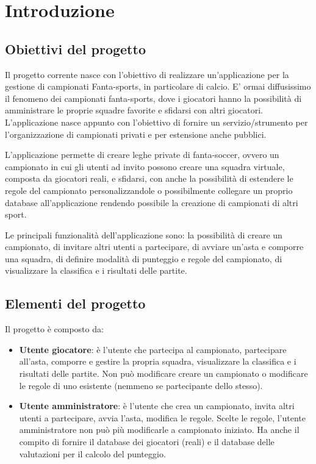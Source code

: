 \documentclass[twoside,openright,titlepage,fleqn,headinclude,12pt,a4paper,BCOR=5mm,footinclude]{scrbook}
\begin{document}
\clearpage
\chapter{Introduzione}
\section{Obiettivi del progetto}
Il progetto corrente nasce con l'obiettivo di realizzare un'applicazione per la gestione di campionati Fanta-sports, in particolare di calcio.
E' ormai diffusissimo il fenomeno dei campionati fanta-sports, dove i giocatori hanno la possibilità di amministrare le proprie squadre favorite e 
sfidarsi con altri giocatori. L'applicazione nasce appunto con l'obiettivo di fornire un servizio/strumento per l'organizzazione di campionati privati e
per estensione anche pubblici.

L'applicazione permette di creare leghe private di fanta-soccer, ovvero un campionato in cui gli utenti ad invito possono creare una squadra virtuale, 
composta da giocatori reali, e sfidarsi, con anche la possibilità di estendere le regole del campionato personalizzandole o possibilmente collegare
un proprio database all'applicazione rendendo possibile la creazione di campionati di altri sport.

Le principali funzionalità dell'applicazione sono: la possibilità di creare un campionato, di invitare altri utenti a partecipare, di avviare un'asta 
e comporre una squadra, di definire modalità di punteggio e regole del campionato, di visualizzare la classifica e i risultati delle partite.

\section{Elementi del progetto}
Il progetto è composto da:
\begin{itemize}
    \item \textbf{Utente giocatore}: è l'utente che partecipa al campionato, partecipare all'asta, comporre e gestire la propria squadra, 
    visualizzare la classifica e i risultati delle partite. Non può modificare creare un campionato o modificare le regole di uno esistente 
    (nemmeno se partecipante dello stesso).
    \item \textbf{Utente amministratore}: è l'utente che crea un campionato, invita altri utenti a partecipare, avvia l'asta, modifica le regole. 
    Scelte le regole, l'utente amministratore non può più modificarle a campionato iniziato. Ha anche il compito di fornire il database dei giocatori 
    (reali) e il database delle valutazioni per il calcolo del punteggio. 
\end{itemize}
\end{document}
